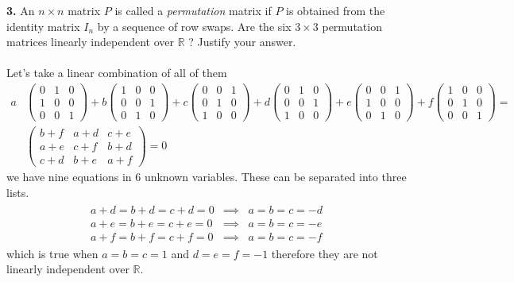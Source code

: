 \documentclass[11pt]{amsart}
\theoremstyle{definition}  %
\newcommand{\R}{\mathbb{R}}
\begin{document}
\vskip 0.1cm
\noindent
{\bf 3.} An $n \times n$ matrix $P$ is called a {\it permutation} matrix if $P$ is obtained from the identity matrix $I_n$ by a sequence 
of row swaps. Are the six $3 \times 3$ permutation matrices linearly independent over $\R$ ? Justify your answer. \\
\\
Let's take a linear combination of all of them
\begin{align*}
	a&\left ( \begin{array}{ccc}
		0 & 1 & 0 \\
		1 & 0 & 0 \\
		0 & 0 & 1 
	\end{array}	 \right ) + 
	b\left ( \begin{array}{ccc}
		1 & 0 & 0 \\
		0 & 0 & 1 \\
		0 & 1 & 0 
	\end{array}	 \right )+ 
	c\left ( \begin{array}{ccc}
		0 & 0 & 1 \\
		0 & 1 & 0 \\
		1 & 0 & 0 
	\end{array}	 \right )+ 
	d\left ( \begin{array}{ccc}
		0 & 1 & 0 \\
		0 & 0 & 1 \\
		1 & 0 & 0 
	\end{array}	 \right )+ 
	e\left ( \begin{array}{ccc}
		0 & 0 & 1 \\
		1 & 0 & 0 \\
		0 & 1 & 0 
	\end{array}	 \right )+ 
	f\left ( \begin{array}{ccc}
		1 & 0 & 0 \\
		0 & 1 & 0 \\
		0 & 0 & 1 
	\end{array}	 \right ) = \\
	&\left ( \begin{array}{ccc}
		b+f & a+d & c+e \\
		a+e & c+f & b+d \\
		c+d & b+e & a+f 
	\end{array}	 \right ) = 0
\end{align*}we have nine equations in 6 unknown variables.  These can be separated into three lists.
\begin{align*}
	\begin{array}{ccc}
		a+d = b+d = c+d = 0 & \implies & a = b = c = -d \\
		a+e = b+e = c+e = 0 & \implies & a = b = c = -e\\
		a+f = b+f = c+f = 0 & \implies & a = b = c = -f
	\end{array}
\end{align*} which is true when $a=b=c=1$ and $d=e=f=-1$ therefore they are not linearly independent over $\R$.
\end{document}
